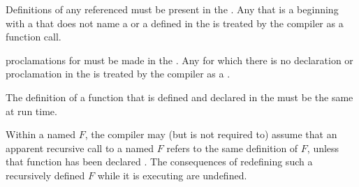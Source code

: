 \beginlist
 \itemitem{\bull} Definitions of any referenced 
must be present in the .  
Any  that is a 
beginning with a  that does not name a
 or a  defined in the 
 is treated by the compiler as a 
function call.

 \itemitem{\bull}  proclamations for 
must be made in the .  Any 
for which there is no  declaration or proclamation in
the  is treated by the compiler as
a .


 \itemitem{\bull} The definition of a function that is defined and
declared  in the  must be
the same at run time.
 
  
 \itemitem{\bull} Within a  named $F$, the compiler may
(but is not required to)
assume that an apparent recursive call to a  named $F$ 
refers to the same definition of $F$,
unless that function has been declared .
The consequences of redefining such a recursively defined  $F$ 
while it is executing are undefined.

